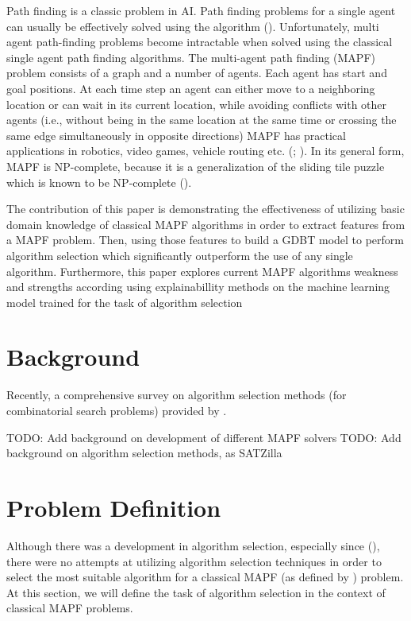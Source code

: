 \documentclass[letterpaper]{article} %
\begin{document}
Path finding is a classic problem in AI. Path finding problems for a single agent can usually be effectively solved using the \astar  algorithm (\cite{appi1966formal}). Unfortunately, multi agent path-finding problems become intractable when solved using the classical single agent path finding algorithms. The multi-agent path finding (MAPF) problem consists of a graph and a number of agents. Each agent has start and goal positions. At each time step an agent can either move to a neighboring location or can wait in its current location, while avoiding conflicts with other agents (i.e., without being in the same location at the same time or crossing the same edge simultaneously in opposite directions)
MAPF has practical applications in robotics, video games, vehicle routing etc. (\cite{silver2005cooperative}; \cite{dresner2008multiagent}). In its general form, MAPF is NP-complete, because it is a generalization of the sliding tile puzzle which is known to be NP-complete (\cite{ratner1986finding}).

The contribution of this paper is demonstrating the effectiveness of utilizing basic domain knowledge of classical MAPF algorithms in order to extract features from a MAPF problem. Then, using those features to build a GDBT model to perform algorithm selection which significantly outperform the use of any single algorithm. Furthermore, this paper explores current MAPF algorithms weakness and strengths according using explainabillity methods on the machine learning model trained for the task of algorithm selection

\section{Background}








Recently, a comprehensive survey on algorithm selection methods (for combinatorial search problems) provided by \cite{hutteralgorithm} .

TODO: Add background on development of different MAPF solvers
TODO: Add background on algorithm selection methods, as SATZilla

\section{Problem Definition}
Although there was a development in algorithm selection, especially since (\cite{xu2008satzilla}), there were no attempts at utilizing algorithm selection techniques in order to select the most suitable algorithm for a classical MAPF (as defined by \cite{stern2019multiagent}) problem. At this section, we will define the task of algorithm selection in the context of classical MAPF problems.
\end{document}
